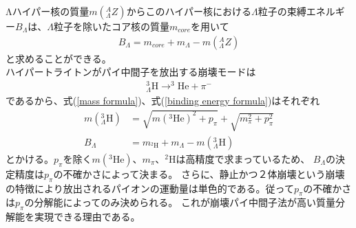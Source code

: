 \documentclass[a4paper,11pt,uplatex]{jsbook}
\begin{document}
Λハイパー核の質量$m(^A_\Lambda Z)$からこのハイパー核における$\Lambda$粒子の束縛エネルギー$B_\Lambda$は、$\Lambda$粒子を除いたコア核の質量$m_{core}$を用いて
\begin{eqnarray}
  B_\Lambda = m_{core} + m_\Lambda - m(^A_\Lambda Z) \label{binding energy formula}
\end{eqnarray}
と求めることができる。
\\ハイパートライトンがパイ中間子を放出する崩壊モードは
\begin{eqnarray}
  ^3_{\Lambda}\text{H} \rightarrow ^3\text{He} + \pi^-
\end{eqnarray}
であるから、式(\ref{mass formula})、式(\ref{binding energy formula})はそれぞれ
\begin{eqnarray}
  m(^3_\Lambda \text{H}) &= \sqrt{m(^3\text{He})^2 + p_\pi} + \sqrt{m_\pi^2 + p_\pi^2} \\
  B_\Lambda &= m_{^2\text{H}} + m_\Lambda - m(^3_\Lambda \text{H})
\end{eqnarray}
とかける。$p_\pi$を除く$m(^3\text{He})$、$m_\pi$、$^2\text{H}$は高精度で求まっているため、
$B_\Lambda$の決定精度は$p_\pi$の不確かさによって決まる。
さらに、静止かつ２体崩壊という崩壊の特徴により放出されるパイオンの運動量は単色的である。従って$p_\pi$の不確かさは$p_\pi$の分解能によってのみ決められる。
これが崩壊パイ中間子法が高い質量分解能を実現できる理由である。
\end{document}
